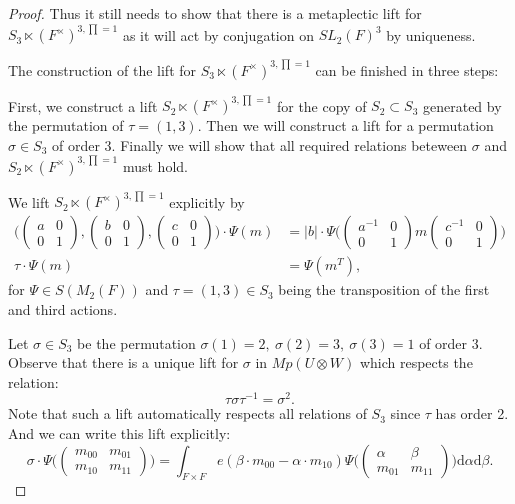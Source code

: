 \documentclass[12pt,a4paper,english]{article}
\theoremstyle{plain}
\theoremstyle{definition}
\begin{document}
\begin{proof}
Thus it still needs to show that there is a metaplectic lift for $S_{3}\ltimes (F^{\times})^{3,\prod=1}$ as it will act by conjugation on $SL_{2}(F)^{3}$ by uniqueness.

The construction of the lift for $S_{3}\ltimes (F^{\times})^{3,\prod=1}$ can be finished in three steps:

First, we construct a lift $S_{2}\ltimes(F^{\times})^{3,\prod=1}$ for the copy of $S_{2}\subset S_{3}$ generated by the permutation of $\tau=(1,3)$. Then we will construct a lift for a permutation $\sigma\in S_{3}$ of order 3. Finally we will show that all required relations beteween $\sigma$ and $S_{2}\ltimes (F^{\times})^{3,\prod=1}$ must hold.

We lift $S_{2}\ltimes (F^{\times})^{3,\prod=1}$ explicitly by
\begin{align*}
    \bigg(\begin{pmatrix}
    a&0\\
    0&1
    \end{pmatrix},\begin{pmatrix}
    b&0\\
    0&1
    \end{pmatrix},
    \begin{pmatrix}
    c&0\\
    0&1
    \end{pmatrix}\bigg)\cdot \Psi(m)&= |b|\cdot \Psi\bigg(\begin{pmatrix}
    a^{-1}&0\\
    0&1
    \end{pmatrix}m\begin{pmatrix}
    c^{-1}&0\\
    0&1
    \end{pmatrix}\bigg)\\
    \tau\cdot\Psi(m)&=\Psi(m^{T}),
\end{align*}
for $\Psi\in S(M_{2}(F))$ and $\tau=(1,3)\in S_{3}$ being the transposition of the first and third actions.

Let $\sigma\in S_{3}$ be the permutation $\sigma(1)=2,\ \sigma(2)=3,\ \sigma(3)=1$ of order 3. Observe that there is a unique lift for $\sigma$ in $Mp(U\otimes W)$ which respects the relation:
\begin{equation*}
    \tau\sigma\tau^{-1}=\sigma^{2}.
\end{equation*}
Note that such a lift automatically respects all relations of $S_{3}$ since $\tau$ has order 2. And we can write this lift explicitly:
\begin{equation*}
    \sigma\cdot\Psi\bigg(\begin{pmatrix}
    m_{00}&m_{01}\\
    m_{10}&m_{11}
    \end{pmatrix}\bigg)=\int_{F\times F}e(\beta\cdot m_{00}-\alpha\cdot m_{10})\Psi\bigg(\begin{pmatrix}
    \alpha &\beta\\
    m_{01}&m_{11}
    \end{pmatrix}\bigg)\text{d}\alpha\text{d}\beta.
\end{equation*}


\end{proof}
\end{document}
